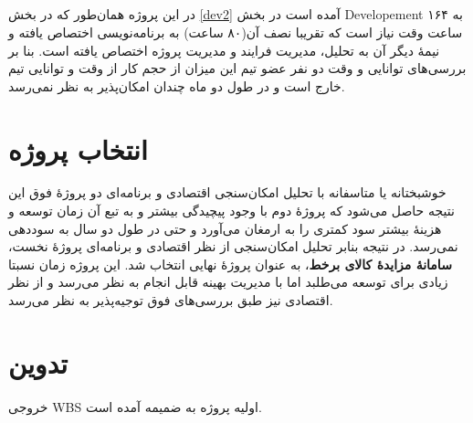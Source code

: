 \documentclass{article}
\begin{document}
\subsection{}


در این پروژه همان‌طور که در بخش \ref{dev2} آمده است در بخش Developement به ۱۶۴ ساعت وقت نیاز است که تقریبا نصف آن(۸۰ ساعت) به برنامه‌نویسی اختصاص یافته و نیمهٔ دیگر آن به تحلیل، مدیریت فرایند و مدیریت پروژه اختصاص یافته است. بنا بر بررسی‌های توانایی و وقت دو نفر عضو تیم این میزان از حجم کار از وقت و توانایی تیم خارج است و در طول دو ماه چندان امکان‌پذیر به نظر نمی‌رسد.


\section{انتخاب پروژه}

خوشبختانه یا متاسفانه با تحلیل امکان‌سنجی اقتصادی و برنامه‌ای دو پروژهٔ فوق این نتیجه حاصل می‌شود که پروژهٔ دوم با وجود پیچیدگی بیشتر و به تبع آن زمان توسعه و هزینهٔ بیشتر سود کمتری را به ارمغان می‌آورد و حتی در طول دو سال به سوددهی نمی‌رسد. در نتیجه بنابر تحلیل امکان‌سنجی از نظر اقتصادی و برنامه‌ای پروژهٔ نخست، \textbf{سامانهٔ مزایدهٔ کالای برخط}، به عنوان پروژهٔ نهایی انتخاب شد. این پروژه زمان نسبتا زیادی برای توسعه می‌طلبد اما با مدیریت بهینه قابل انجام به نظر می‌رسد و از نظر اقتصادی نیز طبق بررسی‌های فوق توجیه‌پذیر به نظر می‌رسد.\\

\section{تدوین }

خروجی WBS اولیه پروژه به ضمیمه آمده است.\\
\end{document}
